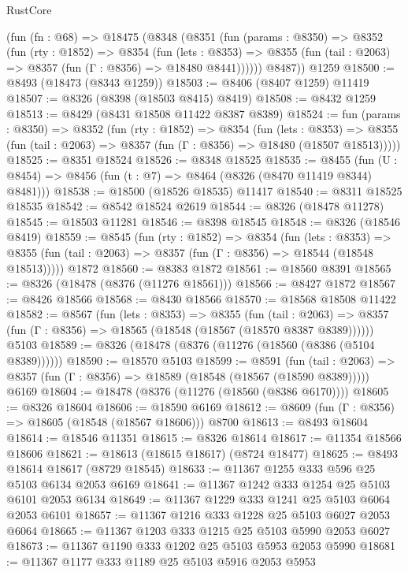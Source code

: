 \begin{lexlean}{RustCore}
\begin{coremodule}
    (fun (fn : @68) =>
    @18475
      (@8348
        (@8351
          (fun (params : @8350) =>
          @8352
            (fun (rty : @1852) =>
            @8354
              (fun (lets : @8353) =>
              @8355 (fun (tail : @2063) => @8357 (fun (Γ : @8356) => @18480 @8441))))))
        @8487))
    @1259
@18500 := @8493 (@18473 (@8343 @1259))
@18503 := @8406 (@8407 @1259) @11419
@18507 := @8326 (@8398 (@18503 @8415) @8419)
@18508 := @8432 @1259
@18513 := @8429 (@8431 @18508 @11422 @8387 @8389)
@18524 := fun (params : @8350) =>
  @8352
    (fun (rty : @1852) =>
    @8354
      (fun (lets : @8353) =>
      @8355 (fun (tail : @2063) => @8357 (fun (Γ : @8356) => @18480 (@18507 @18513)))))
@18525 := @8351 @18524
@18526 := @8348 @18525
@18535 := @8455
    (fun (U : @8454) => @8456 (fun (t : @7) => @8464 (@8326 (@8470 @11419 @8344) @8481)))
@18538 := @18500 (@18526 @18535) @11417
@18540 := @8311 @18525 @18535
@18542 := @8542 @18524 @2619
@18544 := @8326 (@18478 @11278)
@18545 := @18503 @11281
@18546 := @8398 @18545
@18548 := @8326 (@18546 @8419)
@18559 := @8545
    (fun (rty : @1852) =>
    @8354
      (fun (lets : @8353) =>
      @8355 (fun (tail : @2063) => @8357 (fun (Γ : @8356) => @18544 (@18548 @18513)))))
    @1872
@18560 := @8383 @1872
@18561 := @18560 @8391
@18565 := @8326 (@18478 (@8376 (@11276 @18561)))
@18566 := @8427 @1872
@18567 := @8426 @18566
@18568 := @8430 @18566
@18570 := @18568 @18508 @11422
@18582 := @8567
    (fun (lets : @8353) =>
    @8355
      (fun (tail : @2063) =>
      @8357 (fun (Γ : @8356) => @18565 (@18548 (@18567 (@18570 @8387 @8389))))))
    @5103
@18589 := @8326 (@18478 (@8376 (@11276 (@18560 (@8386 (@5104 @8389))))))
@18590 := @18570 @5103
@18599 := @8591
    (fun (tail : @2063) => @8357 (fun (Γ : @8356) => @18589 (@18548 (@18567 (@18590 @8389)))))
    @6169
@18604 := @18478 (@8376 (@11276 (@18560 (@8386 @6170))))
@18605 := @8326 @18604
@18606 := @18590 @6169
@18612 := @8609 (fun (Γ : @8356) => @18605 (@18548 (@18567 @18606))) @8700
@18613 := @8493 @18604
@18614 := @18546 @11351
@18615 := @8326 @18614
@18617 := @11354 @18566 @18606
@18621 := @18613 (@18615 @18617) (@8724 @18477)
@18625 := @8493 @18614 @18617 (@8729 @18545)
@18633 := @11367 @1255 @333 @596 @25 @5103 @6134 @2053 @6169
@18641 := @11367 @1242 @333 @1254 @25 @5103 @6101 @2053 @6134
@18649 := @11367 @1229 @333 @1241 @25 @5103 @6064 @2053 @6101
@18657 := @11367 @1216 @333 @1228 @25 @5103 @6027 @2053 @6064
@18665 := @11367 @1203 @333 @1215 @25 @5103 @5990 @2053 @6027
@18673 := @11367 @1190 @333 @1202 @25 @5103 @5953 @2053 @5990
@18681 := @11367 @1177 @333 @1189 @25 @5103 @5916 @2053 @5953

\end{coremodule}
\end{lexlean}
